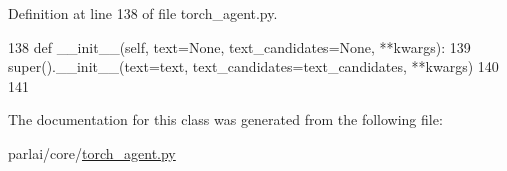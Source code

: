 Definition at line 138 of file torch\+\_\+agent.\+py.


\begin{DoxyCode}
138     \textcolor{keyword}{def }\_\_init\_\_(self, text=None, text\_candidates=None, **kwargs):
139         super().\_\_init\_\_(text=text, text\_candidates=text\_candidates, **kwargs)
140 
141 
\end{DoxyCode}


The documentation for this class was generated from the following file\+:\begin{DoxyCompactItemize}
\item 
parlai/core/\hyperlink{torch__agent_8py}{torch\+\_\+agent.\+py}\end{DoxyCompactItemize}
